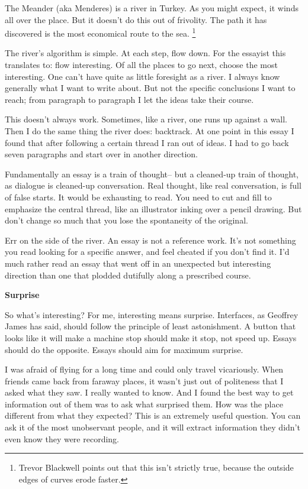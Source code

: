 The Meander (aka Menderes) is a river in Turkey. As you might expect, it
winds all over the place. But it doesn't do this out of frivolity. The
path it has discovered is the most economical route to the sea. \footnote{Trevor Blackwell points out that this isn't strictly true,
because the outside edges of curves erode faster.}

The river's algorithm is simple. At each step, flow down. For the
essayist this translates to: flow interesting. Of all the places to go
next, choose the most interesting. One can't have quite as little
foresight as a river. I always know generally what I want to write
about. But not the specific conclusions I want to reach; from paragraph
to paragraph I let the ideas take their course.

This doesn't always work. Sometimes, like a river, one runs up against a
wall. Then I do the same thing the river does: backtrack. At one point
in this essay I found that after following a certain thread I ran out of
ideas. I had to go back seven paragraphs and start over in another
direction.

Fundamentally an essay is a train of thought-- but a cleaned-up train of
thought, as dialogue is cleaned-up conversation. Real thought, like real
conversation, is full of false starts. It would be exhausting to read.
You need to cut and fill to emphasize the central thread, like an
illustrator inking over a pencil drawing. But don't change so much that
you lose the spontaneity of the original.

Err on the side of the river. An essay is not a reference work. It's not
something you read looking for a specific answer, and feel cheated if
you don't find it. I'd much rather read an essay that went off in an
unexpected but interesting direction than one that plodded dutifully
along a prescribed course.

\textbf{Surprise}

So what's interesting? For me, interesting means surprise. Interfaces,
as Geoffrey James has said, should follow the principle of least
astonishment. A button that looks like it will make a machine stop
should make it stop, not speed up. Essays should do the opposite. Essays
should aim for maximum surprise.

I was afraid of flying for a long time and could only travel
vicariously. When friends came back from faraway places, it wasn't just
out of politeness that I asked what they saw. I really wanted to know.
And I found the best way to get information out of them was to ask what
surprised them. How was the place different from what they expected?
This is an extremely useful question. You can ask it of the most
unobservant people, and it will extract information they didn't even
know they were recording.

